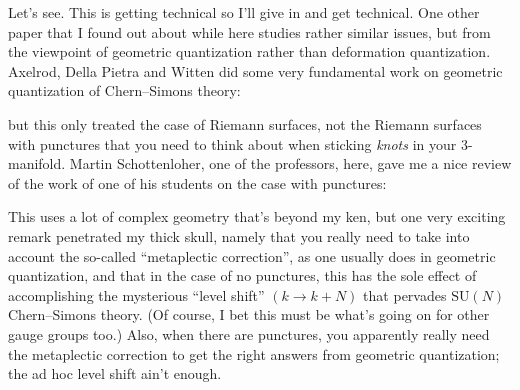 \documentclass[12pt]{article}
\def\tightlist{}
\renewcommand{\texttt}[1]{%
  \begingroup
  \ttfamily
  \begingroup\lccode`~=`/\lowercase{\endgroup\def~}{/\discretionary{}{}{}}%
  \begingroup\lccode`~=`[\lowercase{\endgroup\def~}{[\discretionary{}{}{}}%
  \begingroup\lccode`~=`.\lowercase{\endgroup\def~}{.\discretionary{}{}{}}%
  \catcode`/=\active\catcode`[=\active\catcode`.=\active
  \scantokens{#1\noexpand}%
  \endgroup
}
\begin{document}
Let's see. This is getting technical so I'll give in and get technical.
One other paper that I found out about while here studies rather similar
issues, but from the viewpoint of geometric quantization rather than
deformation quantization. Axelrod, Della Pietra and Witten did some very
fundamental work on geometric quantization of Chern--Simons theory:

\noindent
but this only treated the case of Riemann surfaces, not the Riemann
surfaces with punctures that you need to think about when sticking
\emph{knots} in your 3-manifold. Martin Schottenloher, one of the
professors, here, gave me a nice review of the work of one of his
students on the case with punctures:

\noindent
This uses a lot of complex geometry that's beyond my ken, but one very
exciting remark penetrated my thick skull, namely that you really need
to take into account the so-called ``metaplectic correction'', as one
usually does in geometric quantization, and that in the case of no
punctures, this has the sole effect of accomplishing the mysterious
``level shift'' \((k \to k + N)\) that pervades \(\mathrm{SU}(N)\)
Chern--Simons theory. (Of course, I bet this must be what's going on for
other gauge groups too.) Also, when there are punctures, you apparently
really need the metaplectic correction to get the right answers from
geometric quantization; the ad hoc level shift ain't enough.
\end{document}
